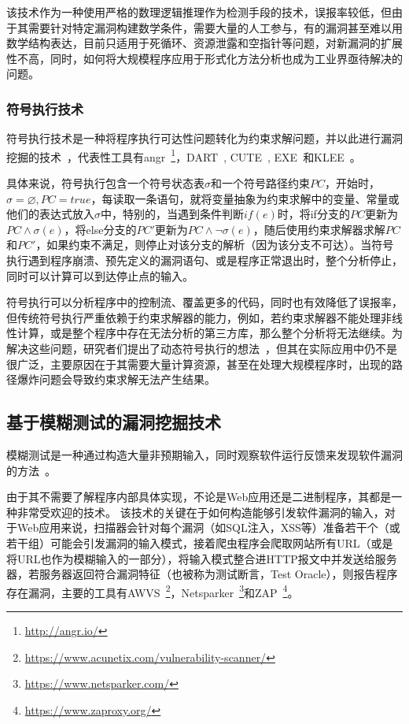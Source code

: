 该技术作为一种使用严格的数理逻辑推理作为检测手段的技术，误报率较低，但由于其需要针对特定漏洞构建数学条件，需要大量的人工参与，有的漏洞甚至难以用数学结构表达，目前只适用于死循环、资源泄露和空指针等问题，对新漏洞的扩展性不高，同时，如何将大规模程序应用于形式化方法分析也成为工业界亟待解决的问题。 

\subsubsection{符号执行技术}
符号执行技术是一种将程序执行可达性问题转化为约束求解问题，并以此进行漏洞挖掘的技术~\cite{sym:sum}，代表性工具有angr~\footnote{\url{http://angr.io/}}，DART~\cite{sym:dart}, CUTE~\cite{sym:cute}, EXE~\cite{sym:exe}和KLEE~\cite{sym:klee}。

具体来说，符号执行包含一个符号状态表$\sigma$和一个符号路径约束$PC$，开始时，$\sigma=\varnothing, PC=true$，每读取一条语句，就将变量抽象为约束求解中的变量、常量或他们的表达式放入$\sigma$中，特别的，当遇到条件判断$if(e)$时，将if分支的$PC$更新为$PC \wedge \sigma(e)$，将else分支的$PC'$更新为$PC\wedge \neg\sigma(e)$，随后使用约束求解器求解$PC$和$PC'$，如果约束不满足，则停止对该分支的解析（因为该分支不可达）。当符号执行遇到程序崩溃、预先定义的漏洞语句、或是程序正常退出时，整个分析停止，同时可以计算可以到达停止点的输入。

符号执行可以分析程序中的控制流、覆盖更多的代码，同时也有效降低了误报率，但传统符号执行严重依赖于约束求解器的能力，例如，若约束求解器不能处理非线性计算，或是整个程序中存在无法分析的第三方库，那么整个分析将无法继续。为解决这些问题，研究者们提出了动态符号执行的想法~\cite{sym:dart,sym:cute,sym:exe,sym:klee}，但其在实际应用中仍不是很广泛，主要原因在于其需要大量计算资源，甚至在处理大规模程序时，出现的路径爆炸问题会导致约束求解无法产生结果。

\subsection{基于模糊测试的漏洞挖掘技术}
模糊测试是一种通过构造大量非预期输入，同时观察软件运行反馈来发现软件漏洞的方法~\cite{fuzzingstateofart}。

由于其不需要了解程序内部具体实现，不论是Web应用还是二进制程序，其都是一种非常受欢迎的技术。
该技术的关键在于如何构造能够引发软件漏洞的输入，对于Web应用来说，扫描器会针对每个漏洞（如SQL注入，XSS等）准备若干个（或若干组）可能会引发漏洞的输入模式，接着爬虫程序会爬取网站所有URL（或是将URL也作为模糊输入的一部分），将输入模式整合进HTTP报文中并发送给服务器，若服务器返回符合漏洞特征（也被称为测试断言，Test Oracle），则报告程序存在漏洞，主要的工具有AWVS~\footnote{\url{https://www.acunetix.com/vulnerability-scanner/}}，Netsparker~\footnote{\url{https://www.netsparker.com/}}和ZAP~\footnote{\url{https://www.zaproxy.org/}}。

